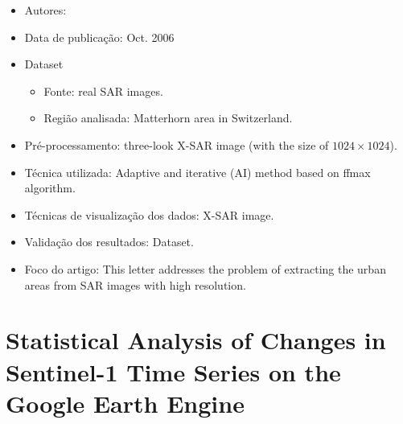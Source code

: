 \documentclass[paper=a4, fontsize=11pt]{scrartcl}
\begin{document}
\begin{itemize}
    \item Autores:~\cite{he2006adaptive}
    \item Data de publicação: Oct. 2006
    \item Dataset
    \begin{itemize}
        \item Fonte: real SAR images.
        \item Região analisada: Matterhorn area in Switzerland.
    \end{itemize}
    \item Pré-processamento: three-look X-SAR image (with the size of $1024 \times 1024$).
    \item Técnica utilizada: Adaptive and iterative (AI) method based on ffmax algorithm.
    \item Técnicas de visualização dos dados: X-SAR image.
    \item Validação dos resultados: Dataset.
    \item Foco do artigo: This letter addresses the problem of extracting the urban areas from SAR images with high resolution.
\end{itemize}

\newpage

\section*{Statistical Analysis of Changes in Sentinel-1 Time Series on the Google Earth Engine} 
\end{document}

